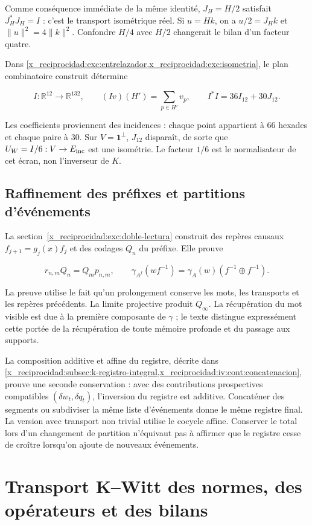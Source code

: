Comme conséquence immédiate de la même identité, \(J_H=H/2\) satisfait \(J_H^*J_H=I\) : c’est le transport isométrique réel. Si \(u=Hk\), on a \(u/2=J_Hk\) et \(\|u\|^2=4\|k\|^2\). Confondre \(H/4\) avec \(H/2\) changerait le bilan d’un facteur quatre.

Dans \cref{x_reciprocidad:exc:entrelazador,x_reciprocidad:exc:isometria}, le plan combinatoire construit détermine

\[
I:\mathbb R^{12}\to\mathbb R^{132},\qquad
(Iv)(H')=\sum_{p\in H'}v_p,\qquad I^*I=36I_{12}+30J_{12}.
\]

Les coefficients proviennent des incidences : chaque point appartient à 66 hexades et chaque paire à 30. Sur \(V=\mathbf1^\perp\), \(J_{12}\) disparaît, de sorte que \(U_W=I/6:V\to E_{\rm inc}\) est une isométrie. Le facteur \(1/6\) est le normalisateur de cet écran, non l’inverseur de \(K\).

\subsection{Raffinement des préfixes et partitions d’événements}

La section~\ref{x_reciprocidad:exc:doble-lectura} construit des repères causaux \(f_{j+1}=g_j(x)f_j\) et des codages \(Q_n\) du préfixe. Elle prouve

\[
r_{n,m}Q_n=Q_mp_{n,m},\qquad
\gamma_{A^f}(wf^{-1})=\gamma_A(w)(f^{-1}\oplus f^{-1}).
\]

La preuve utilise le fait qu’un prolongement conserve les mots, les transports et les repères précédents. La limite projective produit \(Q_\infty\). La récupération du mot visible est due à la première composante de \(\gamma\) ; le texte distingue expressément cette portée de la récupération de toute mémoire profonde et du passage aux supports.

La composition additive et affine du registre, décrite dans \cref{x_reciprocidad:subsec:k-registro-integral,x_reciprocidad:iv:cont:concatenacion}, prouve une seconde conservation : avec des contributions prospectives compatibles \((\delta w_t,\delta q_t)\), l’inversion du registre est additive. Concaténer des segments ou subdiviser la même liste d’événements donne le même registre final. La version avec transport non trivial utilise le cocycle affine. Conserver le total lors d’un changement de partition n’équivaut pas à affirmer que le registre cesse de croître lorsqu’on ajoute de nouveaux événements.

\section{Transport K–Witt des normes, des opérateurs et des bilans}\label{x_reciprocidad:nuc04:kwitt}

